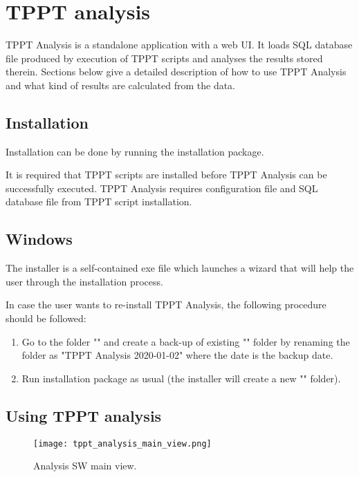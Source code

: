 

\section{TPPT analysis}

TPPT Analysis is a standalone application with a web UI. It loads SQL database file produced by execution of TPPT scripts and analyses the results stored therein. Sections below give a detailed description of how to use TPPT Analysis and what kind of results are calculated from the data.

\subsection{Installation}

Installation can be done by running the installation package.

It is required that TPPT scripts are installed before TPPT Analysis can be successfully executed. TPPT Analysis requires configuration file and SQL database file from TPPT script installation.

\subsection{Windows}

The installer is a self-contained exe file which launches a wizard that will help the user through the installation process.

In case the user wants to re-install TPPT Analysis, the following procedure should be followed:
%
\begin{enumerate}
	\item Go to the folder "\tntRootPath" and create a back-up of existing "\tntTPPTAnalysisFolder" folder by renaming the folder as "TPPT Analysis 2020-01-02" where the date is the backup date.
	\item Run installation package as usual (the installer will create a new "\tntTPPTAnalysisFolder" folder).
\end{enumerate}

\subsection{Using TPPT analysis}

\begin{figure}[!h]
	\centering
	\texttt{[image: tppt\_analysis\_main\_view.png]}
	\caption{Analysis SW main view.}
	\label{fig:tppt_analysis_main_view}
\end{figure}

